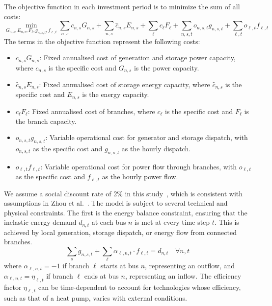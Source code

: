 \documentclass[preprint,12pt]{elsarticle}
\begin{document}
The objective function in each investment period is to minimize the sum of all costs:
\begin{equation}
\min_{G_{n,s}, E_{n,s}, F_\ell, g_{n,s,t}, f_{\ell,t}} \sum_{n,s} c_{n,s} G_{n,s} + \sum_{n,s} \hat{c}_{n,s} E_{n,s} + \sum_{\ell} c_{\ell} F_{\ell} + \sum_{n,s,t} o_{n,s,t} g_{n,s,t} + \sum_{\ell,t} o_{\ell,t} f_{\ell,t}
\end{equation}
The terms in the objective function represent the following costs:
\begin{itemize}
    \item $c_{n,s} G_{n,s}$: Fixed annualised cost of generation and storage power capacity, where $c_{n,s}$ is the specific cost and $G_{n,s}$ is the power capacity.
    \item $\hat{c}_{n,s} E_{n,s}$: Fixed annualised cost of storage energy capacity, where $\hat{c}_{n,s}$ is the specific cost and $E_{n,s}$ is the energy capacity.
    \item $c_{\ell} F_{\ell}$: Fixed annualised cost of branches, where $c_{\ell}$ is the specific cost and $F_{\ell}$ is the branch capacity.
    \item $o_{n,s,t} g_{n,s,t}$: Variable operational cost for generator and storage dispatch, with $o_{n,s,t}$ as the specific cost and $g_{n,s,t}$ as the hourly dispatch.
    \item $o_{\ell,t} f_{\ell,t}$: Variable operational cost for power flow through branches, with $o_{\ell,t}$ as the specific cost and $f_{\ell,t}$ as the hourly power flow.
\end{itemize}
We assume a social discount rate of 2\% in this study~\citep{victoria2020early}, which is consistent with assumptions in Zhou et al.~\citep{zhou_multienergy_2024}.
The model is subject to several technical and physical constraints. The first is the energy balance constraint, ensuring that the inelastic energy demand $d_{n,t}$ at each bus $n$ is met at every time step $t$. This is achieved by local generation, storage dispatch, or energy flow from connected branches.
\begin{equation}
\sum_{s} g_{n,s,t} + \sum_{\ell} \alpha_{\ell,n,t} \cdot f_{\ell,t} = d_{n,t} \quad \forall n, t
\end{equation}
where $\alpha_{\ell,n,t} = -1$ if branch $\ell$ starts at bus $n$, representing an outflow, and $\alpha_{\ell,n,t} = \eta_{\ell,t}$ if branch $\ell$ ends at bus $n$, representing an inflow. The efficiency factor $\eta_{\ell,t}$ can be time-dependent to account for technologies whose efficiency, such as that of a heat pump, varies with external conditions.
\end{document}
